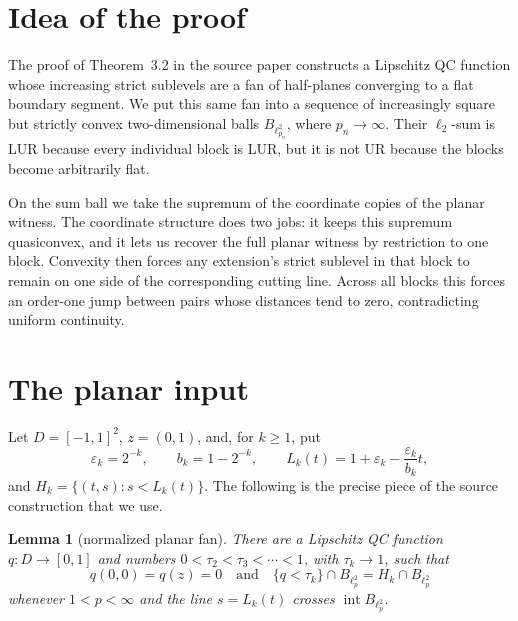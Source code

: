 \documentclass[11pt]{article}
\newtheorem{lemma}{Lemma}
\newcommand{\eps}{\varepsilon}
\begin{document}
\section{Idea of the proof}

The proof of Theorem~3.2 in the source paper constructs a Lipschitz QC
function whose increasing strict sublevels are a fan of half-planes
converging to a flat boundary segment.  We put this same fan into a sequence
of increasingly square but strictly convex two-dimensional balls
$B_{\ell_{p_n}^2}$, where $p_n\to\infty$.  Their $\ell_2$-sum is LUR because
every individual block is LUR, but it is not UR because the blocks become
arbitrarily flat.

On the sum ball we take the supremum of the coordinate copies of the planar
witness.  The coordinate structure does two jobs: it keeps this supremum
quasiconvex, and it lets us recover the full planar witness by restriction to
one block.  Convexity then forces any extension's strict sublevel in that
block to remain on one side of the corresponding cutting line.  Across all
blocks this forces an order-one jump between pairs whose distances tend to
zero, contradicting uniform continuity.

\section{The planar input}

Let $D=[-1,1]^2$, $z=(0,1)$, and, for $k\ge1$, put
\[
  \eps_k=2^{-k},\qquad b_k=1-2^{-k},\qquad
  L_k(t)=1+\eps_k-\frac{\eps_k}{b_k}t,
\]
and $H_k=\{(t,s):s<L_k(t)\}$.  The following is the precise piece of the
source construction that we use.

\begin{lemma}[normalized planar fan]\label{lem:fan}
There are a Lipschitz QC function $q:D\to[0,1]$ and numbers
$0<\tau_2<\tau_3<\cdots<1$, with $\tau_k\to1$, such that
\[
 q(0,0)=q(z)=0
 \quad\text{and}\quad
 \{q<\tau_k\}\cap B_{\ell_p^2}=H_k\cap B_{\ell_p^2}
 \tag{4.1}\label{eq:fan}
\]
whenever $1<p<\infty$ and the line $s=L_k(t)$ crosses
$\operatorname{int}B_{\ell_p^2}$.
\end{lemma}
\end{document}
